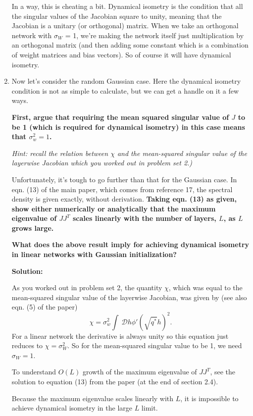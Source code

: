 \documentclass[a4paper]{article}
\begin{document}
\begin{enumerate}[label=(\alph*)]
\begin{tcolorbox}
In a way, this is cheating a bit.  Dynamical isometry is the condition that all the singular values of the Jacobian square to unity, meaning that the Jacobian is a unitary (or orthogonal) matrix.  When we take an orthogonal network with $\sigma_W$ = 1, we're making the network itself just multiplication by an orthogonal matrix (and then adding some constant which is a combination of weight matrices and bias vectors).  So of course it will have dynamical isometry.
\end{tcolorbox}

\item Now let's consider the random Gaussian case.  Here the dynamical isometry condition is not as simple to calculate, but we can get a handle on it a few ways.  

\textbf{First, argue that requiring the mean squared singular value of $J$ to be 1 (which is required for dynamical isometry) in this case means that $\sigma_w^2 = 1$.}

\textit{Hint: recall the relation between $\chi$ and the mean-squared singular value of the layerwise Jacobian which you worked out in problem set 2.)}

Unfortunately, it's tough to go further than that for the Gaussian case.  In eqn. (13) of the main paper, which comes from reference 17, the spectral density is given exactly, without derivation.  
\textbf{Taking eqn. (13) as given, show either numerically or analytically that the maximum eigenvalue of $JJ^T$ scales linearly with the number of layers, $L$, as $L$ grows large.}

\textbf{What does the above result imply for achieving dynamical isometry in linear networks with Gaussian initialization?}

\begin{tcolorbox}
\textbf{Solution:}

As you worked out in problem set 2, the quantity $\chi$, which was equal to the mean-squared singular value of the layerwise Jacobian, was given by (see also eqn. (5) of the paper)
\begin{equation*}
    \chi = \sigma_w^2 \int~\mathcal{D}h \phi ' (\sqrt{q^*} h)^2 .
\end{equation*}
For a linear network the derivative is always unity so this equation just reduces to $\chi =\sigma_W^2$.  So for the mean-squared singular value to be 1, we need $\sigma_W = 1$.

To understand $O(L)$ growth of the maximum eigenvalue of $JJ^T$, see the solution to equation (13) from the paper (at the end of section 2.4).

Because the maximum eigenvalue scales linearly with $L$, it is impossible to achieve dynamical isometry in the large $L$ limit.  
\end{tcolorbox}
\end{enumerate}
\end{document}
